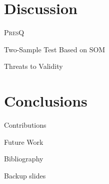 \documentclass[10pt]{beamer}
\newcommand{\PresQ}[0]{\textsc{PresQ}\xspace}
\begin{document}
\section{Discussion}

\begin{frame}{\PresQ}
\end{frame}

\begin{frame}{Two-Sample Test Based on SOM}
\end{frame}

\begin{frame}{Threats to Validity}
\end{frame}

\section{Conclusions}

\begin{frame}{Contributions}
\end{frame}

\begin{frame}{Future Work}
\end{frame}



\begin{frame}[allowframebreaks]{Bibliography}
\printbibliography[]
\end{frame}

\appendix

{
\begin{frame}[standout]
  Backup slides
\end{frame}
}
\end{document}
